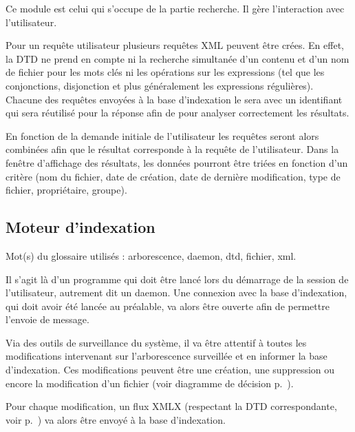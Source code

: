 Ce module est celui qui s'occupe de la partie recherche. Il gère l'interaction avec l'utilisateur.

Pour un requête utilisateur plusieurs requêtes XML peuvent être crées. En effet, la DTD ne prend en compte ni la recherche simultanée d'un contenu et d'un nom de fichier pour les mots clés ni les opérations sur les expressions (tel que les conjonctions, disjonction et plus généralement les expressions régulières). Chacune des requêtes envoyées à la base d'indexation le sera avec un identifiant qui sera réutilisé pour la réponse afin de pour analyser correctement les résultats.

En fonction de la demande initiale de l'utilisateur les requêtes seront alors combinées afin que le résultat corresponde à la requête de l'utilisateur. Dans la fenêtre d'affichage des résultats, les données pourront être triées en fonction d'un critère (nom du fichier, date de création, date de dernière modification, type de fichier, propriétaire, groupe).

\subsection{Moteur d'indexation}
Mot(s) du glossaire utilisés : \gls{arborescence}, \gls{daemon}, \gls{dtd}, \gls{fichier}, \gls{xml}.

Il s'agit là d'un programme qui doit être lancé lors du démarrage de la session de l'utilisateur, autrement dit un daemon. Une connexion avec la base d'indexation, qui doit avoir été lancée au préalable, va alors être ouverte afin de permettre l'envoie de message.

Via des outils de surveillance du système, il va être attentif à toutes les modifications intervenant sur l'arborescence surveillée et en informer la base d'indexation. Ces modifications peuvent être une création, une suppression ou encore la modification d'un fichier (voir diagramme de décision p.~\pageref{decision-daemon}).

Pour chaque modification, un flux XMLX (respectant la DTD correspondante, voir p.~\pageref{dtd_bi_mi}) va alors être envoyé à la base d'indexation.

